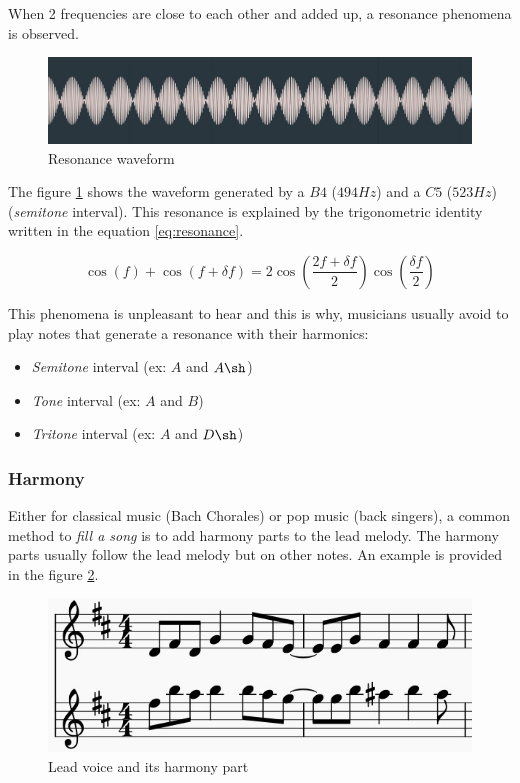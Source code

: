 \documentclass[12pt]{report}
\begin{document}
When 2 frequencies are close to each other and added up, a resonance phenomena is observed.

\begin{figure}[H]
    \centering
    \includegraphics[width=\textwidth]{images/music/waveform/resonance.jpg}
    \caption{Resonance waveform}
    \label{fig:resonance}
\end{figure}
The figure \ref{fig:resonance} shows the waveform generated by a $B4$ ($494Hz$) and a $C5$ ($523Hz$) (\textit{semitone} interval).
This resonance is explained by the trigonometric identity written in the equation \ref{eq:resonance}.

\begin{equation}
    \cos(f) + \cos(f + \delta f) = 2 \cos(\frac{2f + \delta f}{2}) \cos(\frac{\delta f}{2})
    \label{eq:resonance}
\end{equation}

This phenomena is unpleasant to hear and this is why, musicians usually avoid to play notes that generate a resonance with their harmonics:
\begin{itemize}
    \item \textit{Semitone} interval (ex: $A$ and $A\sh$)
    \item \textit{Tone} interval (ex: $A$ and $B$)
    \item \textit{Tritone} interval (ex: $A$ and $D\sh$)
\end{itemize}


\subsubsection{Harmony}

Either for classical music (Bach Chorales) or pop music (back singers), a common method to \textit{fill a song} is to add harmony parts to the lead melody. The harmony parts usually follow the lead melody but on other notes.
An example is provided in the figure \ref{fig:harmony_example}.

\begin{figure}[H]
    \centering
    \includegraphics[width=0.75 \textwidth]{images/music/stave/harmony.jpg}
    \caption{Lead voice and its harmony part}
    \label{fig:harmony_example}
\end{figure}
\end{document}
